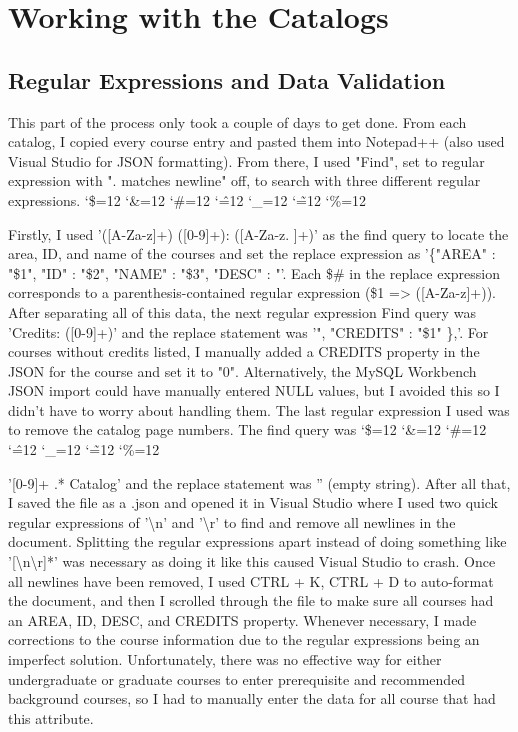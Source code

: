 \documentclass[12pt]{article}
\newenvironment{simplechar}{%
	\catcode`\$=12
	\catcode`\&=12
	\catcode`\#=12
	\catcode`\^=12
	\catcode`\_=12
	\catcode`\~=12
	\catcode`\%=12
}{}
\begin{document}
	\pagebreak
	\section{Working with the Catalogs}
		\subsection{Regular Expressions and Data Validation}
			This part of the process only took a couple of days to get done. From each catalog, I copied every course entry and pasted them into Notepad++ (also used Visual Studio for JSON formatting). From there, I used "Find", set to regular expression with ". matches newline" off, to search with three different regular expressions. 
			\begin{simplechar}
				Firstly, I used '([A-Za-z]+) ([0-9]+): ([A-Za-z\-\/. ]+)' as the find query to locate the area, ID, and name of the courses and set the replace expression as '\{"AREA" : "\$1", "ID" : "\$2", "NAME" : "\$3", "DESC" : "'. Each \$# in the replace expression corresponds to a parenthesis-contained regular expression (\$1 => ([A-Za-z]+)). After separating all of this data, the next regular expression Find query was 'Credits: ([0-9]+)' and the replace statement was '", "CREDITS" : "\$1" \},'.
			\end{simplechar} 
			For courses without credits listed, I manually added a CREDITS property in the JSON for the course and set it to "0". Alternatively, the MySQL Workbench JSON import could have manually entered NULL values, but I avoided this so I didn't have to worry about handling them. The last regular expression I used was to remove the catalog page numbers. The find query was 
			\begin{simplechar}
				'[0-9]+ .* Catalog' and the replace statement was '' (empty string). After all that, I saved the file as a .json and opened it in Visual Studio where I used two quick regular expressions of '\textbackslash n' and '\textbackslash r'
			\end{simplechar}to find and remove all newlines in the document. Splitting the regular expressions apart instead of doing something like '[\textbackslash n\textbackslash r]*' was necessary as doing it like this caused Visual Studio to crash. Once all newlines have been removed, I used CTRL + K, CTRL + D to auto-format the document, and then I scrolled through the file to make sure all courses had an AREA, ID, DESC, and CREDITS property. Whenever necessary, I made corrections to the course information due to the regular expressions being an imperfect solution. Unfortunately, there was no effective way for either undergraduate or graduate courses to enter prerequisite and recommended background courses, so I had to manually enter the data for all course that had this attribute.
			
\end{document}
